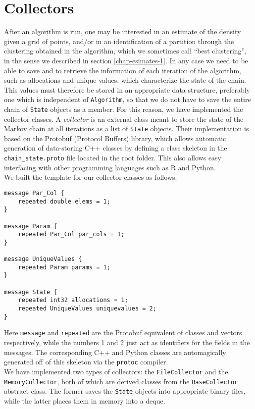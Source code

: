 \section{Collectors}\label{collectors}
After an algorithm is run, one may be interested in an estimate of the density given a grid of points, and/or in an identification of a partition through the clustering obtained in the algorithm, which we sometimes call ``best clustering'', in the sense we described in section \ref{chap-esimates-1}.
In any case we need to be able to save and to retrieve the information of each iteration of the algorithm, such as allocations and unique values, which characterize the state of the chain.
This values must therefore be stored in an appropriate data structure, preferably one which is independent of \verb|Algorithm|, so that we do not have to save the entire chain of \verb|State| objects as a member.
For this reason, we have implemented the collector classes.
A \emph{collector} is an external class meant to store the state of the Markov chain at all iterations as a list of \verb|State| objects.
Their implementation is based on the Protobuf (Protocol Buffers) library, which allows automatic generation of data-storing C++ classes by defining a class skeleton in the \verb|chain_state.proto| file located in the root folder.
This also allows easy interfacing with other programming languages such as R and Python. \\
We built the template for our collector classes as follows:
\begin{verbatim}
message Par_Col {
    repeated double elems = 1;
}

message Param {
    repeated Par_Col par_cols = 1;
}

message UniqueValues {
    repeated Param params = 1;
}

message State {
    repeated int32 allocations = 1;
    repeated UniqueValues uniquevalues = 2;
}
\end{verbatim}
Here \verb|message| and \verb|repeated| are the Protobuf equivalent of classes and vectors respectively, while the numbers 1 and 2 just act as identifiers for the fields in the messages.
The corresponding C++ and Python classes are automagically generated off of this skeleton via the \verb|protoc| compiler. \\
We have implemented two types of collectors: the \verb|FileCollector| and the \verb|MemoryCollector|, both of which are derived classes from the \verb|BaseCollector| abstract class.
The former saves the \verb|State| objects into appropriate binary files, while the latter places them in memory into a deque.
